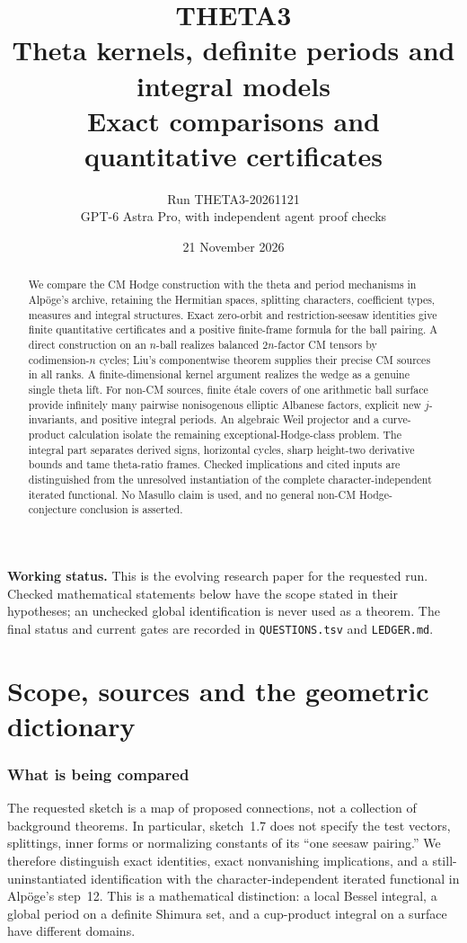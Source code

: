 \documentclass[11pt]{article}
\title{THETA3\\Theta kernels, definite periods and integral models\\\large Exact comparisons and quantitative certificates}
\author{Run THETA3-20261121\\GPT-6 Astra Pro, with independent agent proof checks}
\date{21 November 2026}
\theoremstyle{definition}\newtheorem{definition}[theorem]{Definition}\newtheorem{remark}[theorem]{Remark}
\begin{document}
\maketitle
\begin{abstract}
We compare the CM Hodge construction with the theta and period mechanisms in Alp\"oge's archive, retaining the Hermitian spaces, splitting characters, coefficient types, measures and integral structures. Exact zero-orbit and restriction-seesaw identities give finite quantitative certificates and a positive finite-frame formula for the ball pairing. A direct construction on an $n$-ball realizes balanced $2n$-factor CM tensors by codimension-$n$ cycles; Liu's componentwise theorem supplies their precise CM sources in all ranks. A finite-dimensional kernel argument realizes the wedge as a genuine single theta lift. For non-CM sources, finite \'etale covers of one arithmetic ball surface provide infinitely many pairwise nonisogenous elliptic Albanese factors, explicit new $j$-invariants, and positive integral periods. An algebraic Weil projector and a curve-product calculation isolate the remaining exceptional-Hodge-class problem. The integral part separates derived signs, horizontal cycles, sharp height-two derivative bounds and tame theta-ratio frames. Checked implications and cited inputs are distinguished from the unresolved instantiation of the complete character-independent iterated functional. No Masullo claim is used, and no general non-CM Hodge-conjecture conclusion is asserted.
\end{abstract}
\noindent\textbf{Working status.} This is the evolving research paper for the requested run. Checked mathematical statements below have the scope stated in their hypotheses; an unchecked global identification is never used as a theorem. The final status and current gates are recorded in \texttt{QUESTIONS.tsv} and \texttt{LEDGER.md}.

\tableofcontents\clearpage
\part{Scope, sources and the geometric dictionary}
\section{What is being compared}
The requested sketch is a map of proposed connections, not a collection of background theorems. In particular, sketch~1.7 does not specify the test vectors, splittings, inner forms or normalizing constants of its ``one seesaw pairing.'' We therefore distinguish exact identities, exact nonvanishing implications, and a still-uninstantiated identification with the character-independent iterated functional in Alp\"oge's step~12. This is a mathematical distinction: a local Bessel integral, a global period on a definite Shimura set, and a cup-product integral on a surface have different domains.
\end{document}
